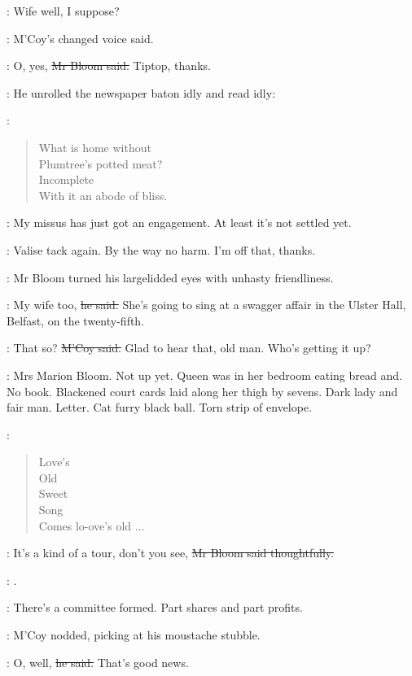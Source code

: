 \mccoy:
Wife well, I suppose?

:
M'Coy's changed voice said.

\Bloom:
O, yes,
\sout{Mr Bloom said.}
Tiptop, thanks.

\begin{samepage}
:
He unrolled the newspaper baton idly and read idly:

\BloomInt:
\begin{verse}
    What is home without \\
    Plumtree's potted meat? \\
    Incomplete \\
    With it an abode of bliss.
\end{verse}
\end{samepage}

\mccoy:
My missus has just got an engagement.
At least it's not settled yet.

\BloomInt:
Valise tack again.
By the way no harm.
I'm off that, thanks.

:
Mr Bloom turned his largelidded eyes
with unhasty friendliness.

\Bloom:
My wife too,
\sout{he said.}
She's going to sing at a swagger affair in the Ulster Hall, Belfast,
on the twenty-fifth.

\mccoy:
That so?
\sout{M'Coy said.}
Glad to hear that, old man.
Who's getting it up?

\BloomInt:
Mrs Marion Bloom.
Not up yet.
Queen was in her bedroom eating bread and.
No book.
Blackened court cards laid along her thigh by sevens.
Dark lady and fair man.
Letter.
Cat furry black ball.
Torn strip of envelope.

\BloomInt:
\begin{verse}
    Love's \\
    Old \\
    Sweet \\
    Song
 \\
    Comes lo-ove's old ...
\end{verse}

\Bloom:
It's a kind of a tour,
don't you see,
\sout{Mr Bloom said thoughtfully.}

\BloomInt:
.

\Bloom:
There's a committee formed.
Part shares and part profits.

:
M'Coy nodded,
picking at his moustache stubble.

\mccoy:
O, well,
\sout{he said.}
That's good news.

